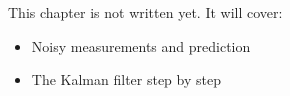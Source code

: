 \label{ch:ctl3}
\begin{keyidea}
This chapter is not written yet. It will cover:
\begin{itemize}[nosep]
  \item Noisy measurements and prediction
  \item The Kalman filter step by step
\end{itemize}
\end{keyidea}
